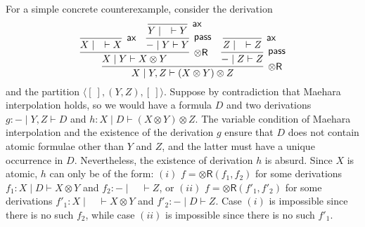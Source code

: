 \documentclass[sn-mathphys-num]{sn-jnl}%
\newcommand{\GG}{\Gamma}
\newcommand{\GD}{\Delta}
\newcommand{\vd}{\vdash}
\newcommand{\tl}{\otimes \mathsf{L}}
\newcommand{\tr}{\otimes\mathsf{R}}
\newcommand{\pass}{\mathsf{pass}}
\newcommand{\ax}{\mathsf{ax}}
\newcommand{\ot}{\otimes}
\newcommand{\SkNMILL}{$\mathtt{SkNMILL}$}
\newcommand{\mf}[1]{\mathsf{#1}}
\theoremstyle{thmstyleone}%
\theoremstyle{thmstyletwo}%
\theoremstyle{thmstylethree}%
\begin{document}
For a simple concrete counterexample, consider the derivation
\begin{equation*}
  \infer[\tr]{X \mid Y, Z \vd (X\ot Y)\ot Z}{
    \infer[\tr]{X \mid Y \vd X \ot Y}{
      \infer[\ax]{X \mid \quad \vd X}{}
      &
      \infer[\pass]{{-} \mid Y \vd Y}{
        \infer[\ax]{Y \mid \quad \vd Y}{}
        }
    }
    &
    \infer[\pass]{{-} \mid Z \vd Z}{
      \infer[\ax]{Z \mid \quad \vd Z}{}
    }
  }
\end{equation*}
and the partition $\langle [\ ], (Y,Z), [\ ]\rangle$. Suppose by contradiction that Maehara interpolation holds, so we would have a formula $D$ and two derivations $g: {-} \mid Y, Z \vd D$ and $h : X \mid D \vd (X\ot Y)\ot Z$.
The variable condition of Maehara interpolation and the existence of the derivation $g$ ensure that $D$ does not contain atomic formulae other than $Y$ and $Z$, and the latter must have a unique occurrence in $D$. Nevertheless, the existence of derivation $h$ is absurd. Since $X$ is atomic, $h$ can only be of the form: $(i)$ $f = \tr(f_1,f_2)$ for some derivations $f_1 : X \mid D \vd X \ot Y$ and $f_2 : {-} \mid \quad \vd Z$, or $(ii)$ $f = \tr(f'_1,f'_2)$ for some derivations $f'_1 : X \mid \quad \vd X \ot Y$ and $f'_2 : {-} \mid D \vd Z$. Case $(i)$ is impossible since there is no such $f_2$, while case $(ii)$ is impossible since there is no such $f'_1$.
\end{document}
